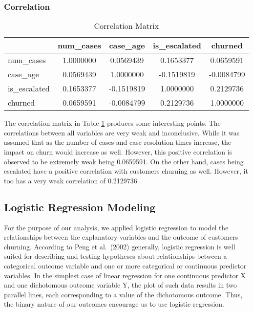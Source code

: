 \documentclass[
]{article}
\begin{document}
\subsubsection{Correlation}\label{correlation}

\begin{table}

\caption{\label{tab:cor-matrix}Correlation Matrix}
\centering
\begin{tabular}[t]{lcccc}
\toprule
  & num\_cases & case\_age & is\_escalated & churned\\
\midrule
num\_cases & 1.0000000 & 0.0569439 & 0.1653377 & 0.0659591\\
case\_age & 0.0569439 & 1.0000000 & -0.1519819 & -0.0084799\\
is\_escalated & 0.1653377 & -0.1519819 & 1.0000000 & 0.2129736\\
churned & 0.0659591 & -0.0084799 & 0.2129736 & 1.0000000\\
\bottomrule
\end{tabular}
\end{table}

The correlation matrix in Table \ref{tab:cor-matrix} produces some interesting points. The correlations between all variables are very weak and inconclusive. While it was assumed that as the number of cases and case resolution times increase, the impact on churn would increase as well. However, this positive correlation is observed to be extremely weak being 0.0659591. On the other hand, cases being escalated have a positive correlation with customers churning as well. However, it too has a very weak correlation of 0.2129736

\subsection{Logistic Regression Modeling}\label{logistic-regression-modeling}

For the purpose of our analysis, we applied logistic regression to model the relationships between the explanatory variables and the outcome of customers churning. According to Peng et al.~(2002) generally, logistic regression is well suited for describing and testing hypotheses about relationships between a categorical outcome variable and one or more categorical or continuous predictor variables. In the simplest case of linear regression for one continuous predictor X and one dichotomous outcome variable Y, the plot of such data results in two parallel lines, each corresponding to a value of the dichotomous outcome. Thus, the binary nature of our outcomes encourage us to use logistic regression.
\end{document}
